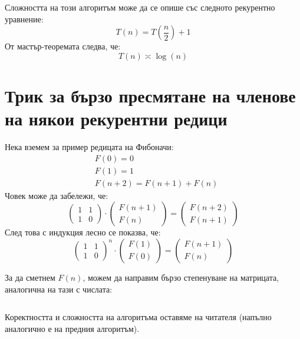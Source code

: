 \documentclass{article}
\theoremstyle{definition}
\theoremstyle{plain}
\theoremstyle{remark}
\theoremstyle{definition}
\begin{document}
Сложността на този алгоритъм може да се опише със следното рекурентно уравнение:
\[
    T(n) = T(\frac{n}{2}) + 1
\]
От мастър-теоремата следва, че:
\[
    T(n) \asymp \log(n)
\]

\pagebreak

\section*{Трик за бързо пресмятане на членове на някои рекурентни редици}

Нека вземем за пример редицата на Фибоначи:
\begin{align*}
     & F(0) = 0                   \\
     & F(1) = 1                   \\
     & F(n + 2) = F(n + 1) + F(n)
\end{align*}
Човек може да забележи, че:
\[
    \begin{pmatrix}
        1 & 1 \\
        1 & 0
    \end{pmatrix}
    \cdot
    \begin{pmatrix}
        F(n + 1) \\
        F(n)
    \end{pmatrix}
    =
    \begin{pmatrix}
        F(n + 2) \\
        F(n + 1)
    \end{pmatrix}
\]
След това с индукция лесно се показва, че:
\[
    \begin{pmatrix}
        1 & 1 \\
        1 & 0
    \end{pmatrix}^n
    \cdot
    \begin{pmatrix}
        F(1) \\
        F(0)
    \end{pmatrix}
    =
    \begin{pmatrix}
        F(n + 1) \\
        F(n)
    \end{pmatrix}
\]

За да сметнем $F(n)$, можем да направим бързо степенуване на матрицата, аналогична на тази с числата:
\inputminted[linenos]{c++}{algorithms/fibonacci.cpp}

Коректността и сложността на алгоритъма оставяме на читателя (напълно аналогично е на предния алгоритъм).

\pagebreak
\end{document}
